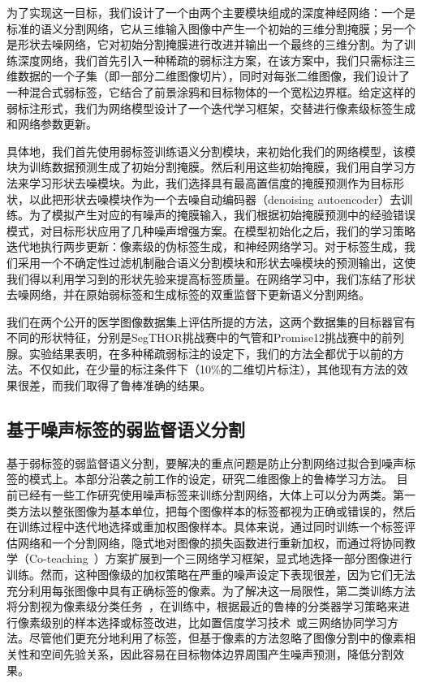 为了实现这一目标，我们设计了一个由两个主要模块组成的深度神经网络：一个是标准的语义分割网络，它从三维输入图像中产生一个初始的三维分割掩膜；另一个是形状去噪网络，它对初始分割掩膜进行改进并输出一个最终的三维分割。为了训练深度网络，我们首先引入一种稀疏的弱标注方案，在该方案中，我们只需标注三维数据的一个子集（即一部分二维图像切片），同时对每张二维图像，我们设计了一种混合式弱标签，它结合了前景涂鸦和目标物体的一个宽松边界框。给定这样的弱标注形式，我们为网络模型设计了一个迭代学习框架，交替进行像素级标签生成和网络参数更新。

具体地，我们首先使用弱标签训练语义分割模块，来初始化我们的网络模型，该模块为训练数据预测生成了初始分割掩膜。然后利用这些初始掩膜，我们用自学习方法来学习形状去噪模块。为此，我们选择具有最高置信度的掩膜预测作为目标形状，以此把形状去噪模块作为一个去噪自动编码器（denoising autoencoder）去训练\citep{vincent2010stacked,Sundermeyer_2018_ECCV}。为了模拟产生对应的有噪声的掩膜输入，我们根据初始掩膜预测中的经验错误模式，对目标形状应用了几种噪声增强方案。在模型初始化之后，我们的学习策略迭代地执行两步更新：像素级的伪标签生成，和神经网络学习。对于标签生成，我们采用一个不确定性过滤机制融合语义分割模块和形状去噪模块的预测输出，这使我们得以利用学习到的形状先验来提高标签质量。在网络学习中，我们冻结了形状去噪网络，并在原始弱标签和生成标签的双重监督下更新语义分割网络。

我们在两个公开的医学图像数据集上评估所提的方法，这两个数据集的目标器官有不同的形状特征，分别是SegTHOR挑战赛\citep{trullo2019multiorgan}中的气管和Promise12挑战赛\citep{Litjens2014EvaluationOP}中的前列腺。实验结果表明，在多种稀疏弱标注的设定下，我们的方法全都优于以前的方法。不仅如此，在少量的标注条件下（10\%的二维切片标注），其他现有方法的效果很差，而我们取得了鲁棒准确的结果。

\subsection{基于噪声标签的弱监督语义分割}
基于弱标签的弱监督语义分割，要解决的重点问题是防止分割网络过拟合到噪声标签的模式上。本部分沿袭之前工作的设定，研究二维图像上的鲁棒学习方法。
目前已经有一些工作研究使用噪声标签来训练分割网络，大体上可以分为两类。第一类方法以整张图像为基本单位，把每个图像样本的标签都视为正确或错误的，然后在训练过程中迭代地选择或重加权图像样本\citep{Zhu2019PickandLearnAQ,Xue2020CascadedRL}。具体来说，\citet{Zhu2019PickandLearnAQ}通过同时训练一个标签评估网络和一个分割网络，隐式地对图像的损失函数进行重新加权，而\citet{Xue2020CascadedRL}通过将协同教学（Co-teaching~\cite{Han2018CoteachingRT}）方案扩展到一个三网络学习框架，显式地选择一部分图像进行训练。然而，这种图像级的加权策略在严重的噪声设定下表现很差，因为它们无法充分利用每张图像中具有正确标签的像素。为了解决这一局限性，第二类训练方法将分割视为像素级分类任务~\citep{Zhang2020CharacterizingLE,Zhang2020RobustMI}，在训练中，根据最近的鲁棒的分类器学习策略来进行像素级别的样本选择或标签改进，比如置信度学习技术~\citep{Zhang2020CharacterizingLE}或三网络协同学习方法\citep{Zhang2020RobustMI}。尽管他们更充分地利用了标签，但基于像素的方法忽略了图像分割中的像素相关性和空间先验关系，因此容易在目标物体边界周围产生噪声预测，降低分割效果。

